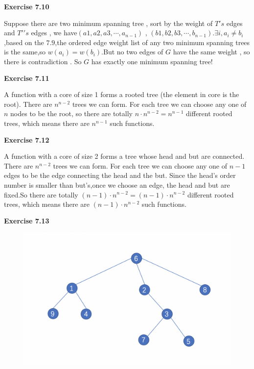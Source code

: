 \documentclass{article} %
\begin{document}
	
	\textbf{Exercise 7.10}\par
	Suppose there are two minimum spanning tree , sort by the weight of $T's$ edges and $T\prime's$ edges , we have$(a1,a2,a3,\cdots,a_{n-1})$ , $(b1,b2,b3,\cdots,b_{n-1})$.$\exists i,a_i \ne b_i$,based on the $7.9$,the ordered edge weight list of any two minimum spanning trees is the same,so $w(a_i)=w(b_i)$.But no two edges of $G$ have the same weight , so there is contradiction . So $G$ has exactly one minimum spanning tree!
	
	\textbf{Exercise 7.11}\par
	
A function with a core of size 1 forms a rooted tree (the element in core is the root). There are $n^{n-2}$ trees we can form. For each tree we can choose any one of $n$ nodes to be the root, so there are totally $n \cdot n^{n-2}=n^{n-1}$ different rooted trees, which means there are $n^{n-1}$ such functions.\par
	\textbf{Exercise 7.12}\par

A function with a core of size 2 forms a tree whose head and but are connected. There are $n^{n-2}$ trees we can form. For each tree we can choose any one of $n-1$ edges to be the edge connecting the head and the but. Since the head's order number is smaller than but's,once we choose an edge, the head and but are fixed.So there are totally $(n-1) \cdot n^{n-2}=(n-1)\cdot n^{n-2}$ different rooted trees, which means there are $(n-1)\cdot n^{n-2}$ such functions.\par
    
    	\textbf{Exercise 7.13}\par
  	\begin{figure}[H]
  	\centering
  	\includegraphics[scale=0.6]{713.png}
  	\caption{}
  	\label{}
  	\end{figure}
	 
\end{document}

